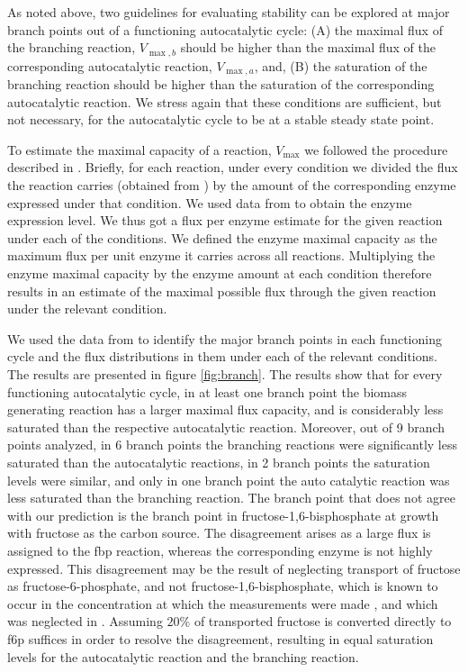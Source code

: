     As noted above, two guidelines for evaluating stability can be explored at major branch points out of a functioning autocatalytic cycle: (A) the maximal flux of the branching reaction, $V_{\max,b}$ should be higher than the maximal flux of the corresponding autocatalytic reaction, $V_{\max,a}$, and, (B) the saturation of the branching reaction should be higher than the saturation of the corresponding autocatalytic reaction.
    We stress again that these conditions are sufficient, but not necessary, for the autocatalytic cycle to be at a stable steady state point.

    To estimate the maximal capacity of a reaction, $V_{\max}$ we followed the procedure described in \cite{Davidi2016-ga}.
    Briefly, for each reaction, under every condition we divided the flux the reaction carries (obtained from \cite{Gerosa2015-oq}) by the amount of the corresponding enzyme expressed under that condition.
    We used data from \cite{Schmidt2015} to obtain the enzyme expression level.
    We thus got a flux per enzyme estimate for the given reaction under each of the conditions.
    We defined the enzyme maximal capacity as the maximum flux per unit enzyme it carries across all reactions.
    Multiplying the enzyme maximal capacity by the enzyme amount at each condition therefore results in an estimate of the maximal possible flux through the given reaction under the relevant condition.


    We used the data from \cite{Gerosa2015-oq} to identify the major branch points in each functioning cycle and the flux distributions in them under each of the relevant conditions.
    The results are presented in figure \ref{fig:branch}.
    The results show that for every functioning autocatalytic cycle, in at least one branch point the biomass generating reaction has a larger maximal flux capacity, and is considerably less saturated than the respective autocatalytic reaction.
    Moreover, out of 9 branch points analyzed, in 6 branch points the branching reactions were significantly less saturated than the autocatalytic reactions, in 2 branch points the saturation levels were similar, and only in one branch point the auto catalytic reaction was less saturated than the branching reaction.
    The branch point that does not agree with our prediction is the branch point in fructose-1,6-bisphosphate at growth with fructose as the carbon source.
    The disagreement arises as a large flux is assigned to the fbp reaction, whereas the corresponding enzyme is not highly expressed.
    This disagreement may be the result of neglecting transport of fructose as fructose-6-phosphate, and not fructose-1,6-bisphosphate, which is known to occur in the concentration at which the measurements were made \cite{Kornberg1990-ft}, and which was neglected in \cite{Gerosa2015-oq}.
    Assuming $20\%$ of transported fructose is converted directly to f6p suffices in order to resolve the disagreement, resulting in equal saturation levels for the autocatalytic reaction and the branching reaction.

